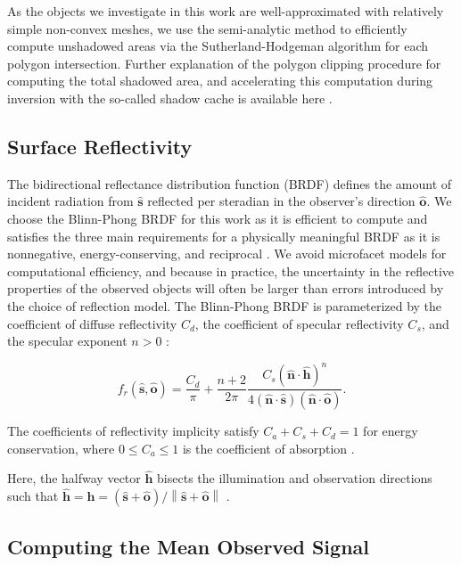 \documentclass[a4paper,twocolumn]{spaceDebrisC} %
\newcommand{\vctr}[1]{\bm{#1}}
\newcommand{\unitv}[1]{\hat{\vctr{#1}}}
\newcommand{\norm}[1]{\left\lVert#1\right\rVert}
\begin{document}
As the objects we investigate in this work are well-approximated with relatively simple non-convex meshes, we use the semi-analytic method to efficiently compute unshadowed areas via the Sutherland-Hodgeman algorithm \cite{sutherland1974} for each polygon intersection. Further explanation of the polygon clipping procedure for computing the total shadowed area, and accelerating this computation during inversion with the so-called shadow cache is available here \cite{robinson2025att}.

\subsection{Surface Reflectivity}

The bidirectional reflectance distribution function (BRDF) defines the amount of incident radiation from $\unitv{s}$ reflected per steradian in the observer's direction $\unitv{o}$. We choose the Blinn-Phong \cite{blinn1977} BRDF for this work as it is efficient to compute and satisfies the three main requirements for a physically meaningful BRDF as it is nonnegative, energy-conserving, and reciprocal \cite{duvenhage2013}. We avoid microfacet models for computational efficiency, and because in practice, the uncertainty in the reflective properties of the observed objects will often be larger than errors introduced by the choice of reflection model. The Blinn-Phong BRDF is parameterized by the coefficient of diffuse reflectivity $C_d$, the coefficient of specular reflectivity $C_s$, and the specular exponent $n>0$ \cite{duvenhage2013}:

\begin{equation} \label{eq:brdf_blinn_phong}
 f_r(\unitv{s}, \unitv{o}) = \frac{C_d}{\pi} + \frac{n+2}{2\pi} \frac{C_s (\unitv{n} \cdot \unitv{h})^n}{4 (\unitv{n} \cdot \unitv{s})(\unitv{n} \cdot \unitv{o})}.
\end{equation}

The coefficients of reflectivity implicity satisfy $C_a + C_s + C_d = 1$ for energy conservation, where $ 0 \leq C_a \leq 1$ is the coefficient of absorption \cite{fan2020thesis}.

Here, the halfway vector $\unitv{h}$ bisects the illumination and observation directions such that $\unitv{h} = \unitv{h} = (\unitv{s} + \unitv{o})/\norm{\unitv{s} + \unitv{o}}$ \cite{duvenhage2013}.

\subsection{Computing the Mean Observed Signal}
\end{document}
